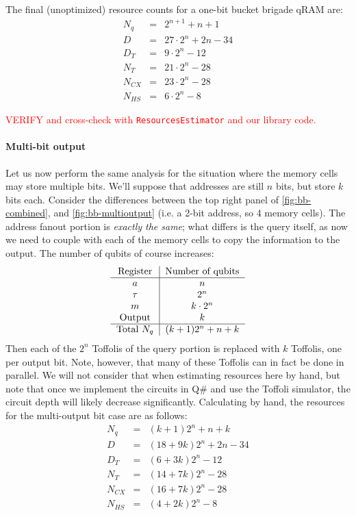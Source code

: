 \documentclass[a4paper,12pt]{article}
\newcommand\todo[1]{\textcolor{red}{#1}}
\begin{document}
The final (unoptimized) resource counts for a one-bit bucket brigade qRAM are:
\begin{eqnarray}
 N_q &=& 2^{n+1} + n + 1 \\ \nonumber
 D   &=& 27 \cdot 2^n + 2n -34 \\ \nonumber
 D_T &=& 9 \cdot 2^n - 12 \\ \nonumber
 N_T &=& 21 \cdot 2^n - 28 \\ \nonumber
 N_{CX} &=& 23 \cdot 2^n - 28 \\ \nonumber
 N_{HS} &=& 6 \cdot 2^n - 8
\end{eqnarray}
 
 
 \todo{VERIFY and cross-check with \texttt{ResourcesEstimator} and our library code.}
 
\paragraph{Multi-bit output}

Let us now perform the same analysis for the situation where the memory cells may store multiple bits.
We'll suppose that addresses are still $n$ bits, but store $k$ bits each. 
Consider the differences between the top right panel of \autoref{fig:bb-combined}, and \autoref{fig:bb-multioutput} (i.e. a 2-bit address, so 4 memory cells). 
The address fanout portion is \emph{exactly the same}; what differs is the query itself, as now we need to couple with each of the memory cells to copy the information to the output.
The number of qubits of course increases:
\begin{equation}
 \begin{tabular}{c|c}
  Register & Number  of qubits \\ \hline
  $a$ & $n$ \\
  $\tau$ & $2^n$ \\
  $m$ & $k \cdot 2^n$ \\
  Output & $k$ \\ \hline
  Total $N_q$ & $(k + 1) 2^n + n + k$
 \end{tabular}
\end{equation} 
Then each of the $2^n$ Toffolis of the query portion is replaced with $k$ Toffolis, one per output bit.
Note, however, that many of these Toffolis can in fact be done in parallel. 
We will not consider that when estimating resources here by hand, but note that once we implement the circuits in Q\# and use the Toffoli simulator, the circuit depth will likely decrease significantly.
Calculating by hand, the resources for the multi-output bit case are as follows:
\begin{eqnarray}
 N_q &=& (k + 1) 2^n + n + k \\ \nonumber
 D   &=& (18 + 9k)2^n + 2n - 34 \\ \nonumber
 D_T &=& (6+3k)2^n - 12 \\ \nonumber
 N_T &=& (14 + 7k)2^n - 28 \\ \nonumber
 N_{CX} &=& (16+7k)2^n - 28  \\ \nonumber
 N_{HS} &=& (4+2k)2^n - 8
\end{eqnarray}
\end{document}
